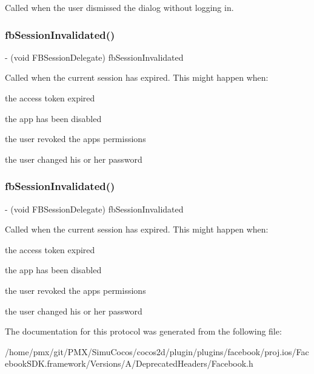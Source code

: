 Called when the user dismissed the dialog without logging in. \mbox{\label{protocolFBSessionDelegate_01-p_a7267d87ae3fb160c0ac22d69781e8c42}} 
\subsubsection{\texorpdfstring{fb\+Session\+Invalidated()}{fbSessionInvalidated()}\hspace{0.1cm}{\footnotesize\ttfamily [1/2]}}
{\footnotesize\ttfamily -\/ (void F\+B\+Session\+Delegate) fb\+Session\+Invalidated \begin{DoxyParamCaption}{ }\end{DoxyParamCaption}}

Called when the current session has expired. This might happen when\+:
\begin{DoxyItemize}
\item the access token expired
\item the app has been disabled
\item the user revoked the app\textquotesingle{}s permissions
\item the user changed his or her password 
\end{DoxyItemize}\mbox{\label{protocolFBSessionDelegate_01-p_a7267d87ae3fb160c0ac22d69781e8c42}} 
\subsubsection{\texorpdfstring{fb\+Session\+Invalidated()}{fbSessionInvalidated()}\hspace{0.1cm}{\footnotesize\ttfamily [2/2]}}
{\footnotesize\ttfamily -\/ (void F\+B\+Session\+Delegate) fb\+Session\+Invalidated \begin{DoxyParamCaption}{ }\end{DoxyParamCaption}}

Called when the current session has expired. This might happen when\+:
\begin{DoxyItemize}
\item the access token expired
\item the app has been disabled
\item the user revoked the app\textquotesingle{}s permissions
\item the user changed his or her password 
\end{DoxyItemize}

The documentation for this protocol was generated from the following file\+:\begin{DoxyCompactItemize}
\item 
/home/pmx/git/\+P\+M\+X/\+Simu\+Cocos/cocos2d/plugin/plugins/facebook/proj.\+ios/\+Facebook\+S\+D\+K.\+framework/\+Versions/\+A/\+Deprecated\+Headers/Facebook.\+h\end{DoxyCompactItemize}
